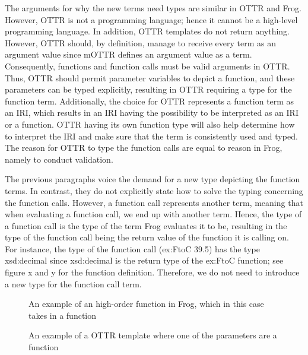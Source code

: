 \para
The arguments for why the new terms need types are similar in OTTR and Frog. However, OTTR is not a programming language; hence it cannot be a high-level programming language. In addition, OTTR templates do not return anything. However, OTTR should, by definition, manage to receive every term as an argument value since mOTTR defines an argument value as a term. Consequently, functions and function calls must be valid arguments in OTTR. Thus, OTTR should permit parameter variables to depict a function, and these parameters can be typed explicitly, resulting in OTTR requiring a type for the function term. Additionally, the choice for OTTR represents a function term as an IRI, which results in an IRI having the possibility to be interpreted as an IRI or a function. OTTR having its own function type will also help determine how to interpret the IRI and make sure that the term is consistently used and typed. The reason for OTTR to type the function calls are equal to reason in Frog, namely to conduct validation. 

\para
The previous paragraphs voice the demand for a new type depicting the function terms. In contrast, they do not explicitly state how to solve the typing concerning the function calls. However, a function call represents another term, meaning that when evaluating a function call, we end up with another term. Hence, the type of a function call is the type of the term Frog evaluates it to be, resulting in the type of the function call being the return value of the function it is calling on. For instance, the type of the function call (ex:FtoC 39.5) has the type xsd:decimal since xsd:decimal is the return type of the ex:FtoC function; see figure x and y for the function definition. Therefore, we do not need to introduce a new type for the function call term.

\begin{figure}
    
    \caption{An example of an high-order function in Frog, which in this case takes in a function}
    \label{fig:frog_high_example}
\end{figure}

\begin{figure}
    
    \caption{An example of a OTTR template where one of the parameters are a function}
    \label{fig:temlate_parameter_function}
\end{figure}


